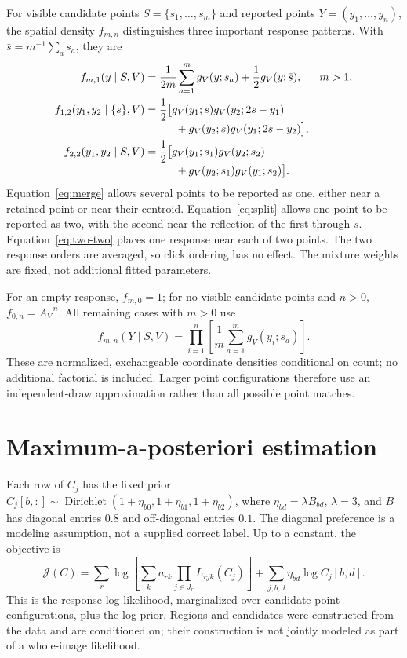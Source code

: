 \documentclass[a4paper,11pt]{article}
\DeclareMathOperator{\Dir}{Dirichlet}
\begin{document}
For visible candidate points $S=\{s_1,\ldots,s_m\}$ and reported points
$Y=(y_1,\ldots,y_n)$, the spatial density $f_{m,n}$ distinguishes three
important response patterns. With $\bar s=m^{-1}\sum_a s_a$, they are
\begin{align}
 f_{m,1}(y\mid S,V)
 &=\frac{1}{2m}\sum_{a=1}^m g_V(y;s_a)
   +\frac12 g_V(y;\bar s), &&m>1,
 \label{eq:merge}\\
 f_{1,2}(y_1,y_2\mid\{s\},V)
 &=\frac12\bigl[g_V(y_1;s)g_V(y_2;2s-y_1)
 \notag\\[-2pt]
 &\hspace{2.8em}+g_V(y_2;s)g_V(y_1;2s-y_2)\bigr],
 \label{eq:split}\\
 f_{2,2}(y_1,y_2\mid S,V)
 &=\frac12\bigl[g_V(y_1;s_1)g_V(y_2;s_2)
 \notag\\[-2pt]
 &\hspace{2.8em}+g_V(y_2;s_1)g_V(y_1;s_2)\bigr].
 \label{eq:two-two}
\end{align}
Equation~\eqref{eq:merge} allows several points to be reported as one,
either near a retained point or near their centroid.
Equation~\eqref{eq:split} allows one point to be reported as two, with the
second near the reflection of the first through $s$.
Equation~\eqref{eq:two-two} places one response near each of two points.
The two response orders are averaged, so click ordering has no effect.
The mixture weights are fixed, not additional fitted parameters.

For an empty response, $f_{m,0}=1$; for no visible candidate points and
$n>0$, $f_{0,n}=A_V^{-n}$. All remaining cases with $m>0$ use
\begin{equation}
 f_{m,n}(Y\mid S,V)=\prod_{i=1}^{n}
       \left[\frac1m\sum_{a=1}^{m}g_V(y_i;s_a)\right].
 \label{eq:remaining}
\end{equation}
These are normalized, exchangeable coordinate densities conditional on count;
no additional factorial is included. Larger point configurations therefore
use an independent-draw approximation rather than all possible point matches.

\section*{Maximum-a-posteriori estimation}

Each row of $C_j$ has the fixed prior
$C_j[b,:]\sim\Dir(1+\eta_{b0},1+\eta_{b1},1+\eta_{b2})$, where
$\eta_{bd}=\lambda B_{bd}$, $\lambda=3$, and $B$ has diagonal entries $0.8$
and off-diagonal entries $0.1$. The diagonal preference is a modeling
assumption, not a supplied correct label. Up to a constant, the objective is
\begin{equation}
 \mathcal J(C)=\sum_r\log\!\left[
       \sum_k a_{rk}\prod_{j\in J_r}L_{rjk}(C_j)\right]
       +\sum_{j,b,d}\eta_{bd}\log C_j[b,d].
 \label{eq:objective}
\end{equation}
This is the response log likelihood, marginalized over candidate point
configurations, plus the log prior. Regions and candidates were constructed
from the data and are conditioned on; their construction is not jointly
modeled as part of a whole-image likelihood.
\end{document}
